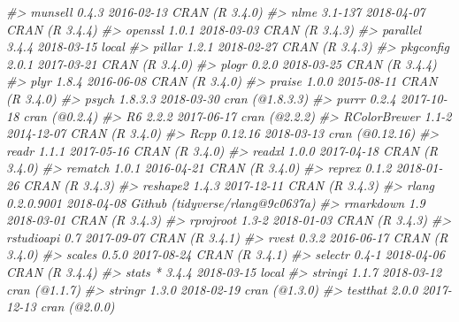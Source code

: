 \documentclass[]{book}
\newenvironment{Shaded}{\begin{snugshade}}{\end{snugshade}}
\newcommand{\CommentTok}[1]{\textcolor[rgb]{0.56,0.35,0.01}{\textit{#1}}}
\theoremstyle{definition}
\theoremstyle{definition}
\theoremstyle{definition}
\theoremstyle{remark}
\begin{document}
\begin{Shaded}
\begin{Highlighting}[]
\CommentTok{#>  munsell        0.4.3      2016-02-13 CRAN (R 3.4.0)                  }
\CommentTok{#>  nlme           3.1-137    2018-04-07 CRAN (R 3.4.4)                  }
\CommentTok{#>  openssl        1.0.1      2018-03-03 CRAN (R 3.4.3)                  }
\CommentTok{#>  parallel       3.4.4      2018-03-15 local                           }
\CommentTok{#>  pillar         1.2.1      2018-02-27 CRAN (R 3.4.3)                  }
\CommentTok{#>  pkgconfig      2.0.1      2017-03-21 CRAN (R 3.4.0)                  }
\CommentTok{#>  plogr          0.2.0      2018-03-25 CRAN (R 3.4.4)                  }
\CommentTok{#>  plyr           1.8.4      2016-06-08 CRAN (R 3.4.0)                  }
\CommentTok{#>  praise         1.0.0      2015-08-11 CRAN (R 3.4.0)                  }
\CommentTok{#>  psych          1.8.3.3    2018-03-30 cran (@1.8.3.3)                 }
\CommentTok{#>  purrr          0.2.4      2017-10-18 cran (@0.2.4)                   }
\CommentTok{#>  R6             2.2.2      2017-06-17 cran (@2.2.2)                   }
\CommentTok{#>  RColorBrewer   1.1-2      2014-12-07 CRAN (R 3.4.0)                  }
\CommentTok{#>  Rcpp           0.12.16    2018-03-13 cran (@0.12.16)                 }
\CommentTok{#>  readr          1.1.1      2017-05-16 CRAN (R 3.4.0)                  }
\CommentTok{#>  readxl         1.0.0      2017-04-18 CRAN (R 3.4.0)                  }
\CommentTok{#>  rematch        1.0.1      2016-04-21 CRAN (R 3.4.0)                  }
\CommentTok{#>  reprex         0.1.2      2018-01-26 CRAN (R 3.4.3)                  }
\CommentTok{#>  reshape2       1.4.3      2017-12-11 CRAN (R 3.4.3)                  }
\CommentTok{#>  rlang          0.2.0.9001 2018-04-08 Github (tidyverse/rlang@9c0637a)}
\CommentTok{#>  rmarkdown      1.9        2018-03-01 CRAN (R 3.4.3)                  }
\CommentTok{#>  rprojroot      1.3-2      2018-01-03 CRAN (R 3.4.3)                  }
\CommentTok{#>  rstudioapi     0.7        2017-09-07 CRAN (R 3.4.1)                  }
\CommentTok{#>  rvest          0.3.2      2016-06-17 CRAN (R 3.4.0)                  }
\CommentTok{#>  scales         0.5.0      2017-08-24 CRAN (R 3.4.1)                  }
\CommentTok{#>  selectr        0.4-1      2018-04-06 CRAN (R 3.4.4)                  }
\CommentTok{#>  stats        * 3.4.4      2018-03-15 local                           }
\CommentTok{#>  stringi        1.1.7      2018-03-12 cran (@1.1.7)                   }
\CommentTok{#>  stringr        1.3.0      2018-02-19 cran (@1.3.0)                   }
\CommentTok{#>  testthat       2.0.0      2017-12-13 cran (@2.0.0)                   }

\end{Highlighting}
\end{Shaded}
\end{document}
